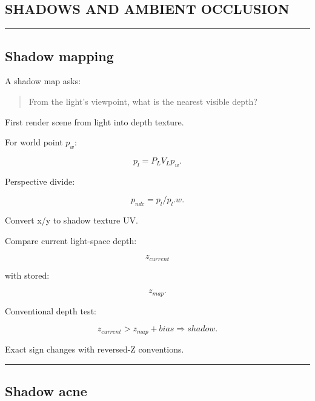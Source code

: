 \subsection{SHADOWS AND AMBIENT OCCLUSION}\label{04-visual-computing-ii-ch040-shadows-and-ambient-occlusion}

\hypertarget{04-visual-computing-ii-ch040-shadows-and-ambient-occlusion}{}

\begin{center}\rule{0.5\linewidth}{0.5pt}\end{center}

\subsection{Shadow mapping}\label{04-visual-computing-ii-ch040-shadow-mapping}

\hypertarget{04-visual-computing-ii-ch040-shadow-mapping}{}

A shadow map asks:

\begin{quote}
From the light's viewpoint, what is the nearest visible depth?
\end{quote}

First render scene from light into depth texture.

For world point \(p_w\):

\[
p_l=
P_LV_Lp_w.
\]

Perspective divide:

\[
p_{ndc}
=
p_l/p_l.w.
\]

Convert x/y to shadow texture UV.

Compare current light-space depth:

\[
z_{current}
\]

with stored:

\[
z_{map}.
\]

Conventional depth test:

\[
\boxed{
z_{current}
>
z_{map}+bias
\Rightarrow
shadow.
}
\]

Exact sign changes with reversed-Z conventions.

\begin{center}\rule{0.5\linewidth}{0.5pt}\end{center}

\subsection{Shadow acne}\label{04-visual-computing-ii-ch040-shadow-acne}

